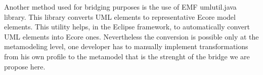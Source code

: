 Another method used for bridging purposes is the use of EMF umlutil.java library. This library converts UML elements to representative Ecore model elements. This utility helps, in the Eclipse framework, to automatically convert UML elements into Ecore ones. Nevertheless the conversion is possible only at the metamodeling level, one developer has to manually implement transformations from his own profile to the metamodel that is the strenght of the bridge we are propose here.

